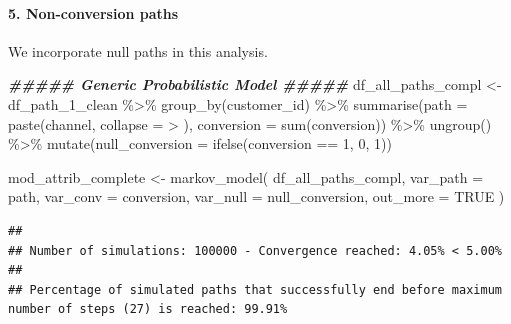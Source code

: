 \documentclass[
]{book}
\newenvironment{Shaded}{\begin{snugshade}}{\end{snugshade}}
\newcommand{\AttributeTok}[1]{\textcolor[rgb]{0.77,0.63,0.00}{#1}}
\newcommand{\ConstantTok}[1]{\textcolor[rgb]{0.00,0.00,0.00}{#1}}
\newcommand{\DecValTok}[1]{\textcolor[rgb]{0.00,0.00,0.81}{#1}}
\newcommand{\DocumentationTok}[1]{\textcolor[rgb]{0.56,0.35,0.01}{\textbf{\textit{#1}}}}
\newcommand{\FunctionTok}[1]{\textcolor[rgb]{0.00,0.00,0.00}{#1}}
\newcommand{\NormalTok}[1]{#1}
\newcommand{\OtherTok}[1]{\textcolor[rgb]{0.56,0.35,0.01}{#1}}
\newcommand{\SpecialCharTok}[1]{\textcolor[rgb]{0.00,0.00,0.00}{#1}}
\newcommand{\StringTok}[1]{\textcolor[rgb]{0.31,0.60,0.02}{#1}}
\begin{document}
\hypertarget{non-conversion-paths}{%
\paragraph{5. Non-conversion paths}\label{non-conversion-paths}}

We incorporate null paths in this analysis.

\begin{Shaded}
\begin{Highlighting}[]
\DocumentationTok{\#\#\#\#\# Generic Probabilistic Model \#\#\#\#\#}
\NormalTok{df\_all\_paths\_compl }\OtherTok{\textless{}{-}}\NormalTok{ df\_path\_1\_clean }\SpecialCharTok{\%\textgreater{}\%}
        \FunctionTok{group\_by}\NormalTok{(customer\_id) }\SpecialCharTok{\%\textgreater{}\%}
        \FunctionTok{summarise}\NormalTok{(}\AttributeTok{path =} \FunctionTok{paste}\NormalTok{(channel, }\AttributeTok{collapse =} \StringTok{\textquotesingle{} \textgreater{} \textquotesingle{}}\NormalTok{),}
                  \AttributeTok{conversion =} \FunctionTok{sum}\NormalTok{(conversion)) }\SpecialCharTok{\%\textgreater{}\%}
        \FunctionTok{ungroup}\NormalTok{() }\SpecialCharTok{\%\textgreater{}\%}
        \FunctionTok{mutate}\NormalTok{(}\AttributeTok{null\_conversion =} \FunctionTok{ifelse}\NormalTok{(conversion }\SpecialCharTok{==} \DecValTok{1}\NormalTok{, }\DecValTok{0}\NormalTok{, }\DecValTok{1}\NormalTok{))}
 
\NormalTok{mod\_attrib\_complete }\OtherTok{\textless{}{-}} \FunctionTok{markov\_model}\NormalTok{(}
\NormalTok{        df\_all\_paths\_compl,}
        \AttributeTok{var\_path =} \StringTok{\textquotesingle{}path\textquotesingle{}}\NormalTok{,}
        \AttributeTok{var\_conv =} \StringTok{\textquotesingle{}conversion\textquotesingle{}}\NormalTok{,}
        \AttributeTok{var\_null =} \StringTok{\textquotesingle{}null\_conversion\textquotesingle{}}\NormalTok{,}
        \AttributeTok{out\_more =} \ConstantTok{TRUE}
\NormalTok{)}
\end{Highlighting}
\end{Shaded}

\begin{verbatim}
## 
## Number of simulations: 100000 - Convergence reached: 4.05% < 5.00%
## 
## Percentage of simulated paths that successfully end before maximum number of steps (27) is reached: 99.91%
\end{verbatim}
\end{document}
